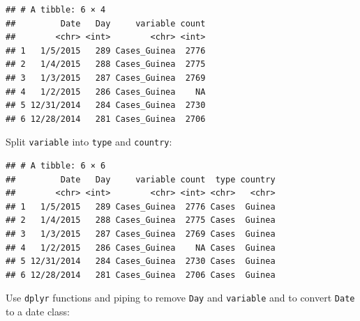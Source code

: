 \documentclass[]{book}
\makeatletter
\newenvironment{Shaded}{\begin{snugshade}}{\end{snugshade}}
\newcommand{\KeywordTok}[1]{\textcolor[rgb]{0.13,0.29,0.53}{\textbf{{#1}}}}
\newcommand{\DataTypeTok}[1]{\textcolor[rgb]{0.13,0.29,0.53}{{#1}}}
\newcommand{\DecValTok}[1]{\textcolor[rgb]{0.00,0.00,0.81}{{#1}}}
\newcommand{\StringTok}[1]{\textcolor[rgb]{0.31,0.60,0.02}{{#1}}}
\newcommand{\OtherTok}[1]{\textcolor[rgb]{0.56,0.35,0.01}{{#1}}}
\newcommand{\NormalTok}[1]{{#1}}
\newenvironment{kframe}{%
\medskip{}
\setlength{\fboxsep}{.8em}
 \def\at@end@of@kframe{}%
 \ifinner\ifhmode%
  \def\at@end@of@kframe{\end{minipage}}%
  \begin{minipage}{\columnwidth}%
 \fi\fi%
 \def\FrameCommand##1{\hskip\@totalleftmargin \hskip-\fboxsep
 \colorbox{shadecolor}{##1}\hskip-\fboxsep
     \hskip-\linewidth \hskip-\@totalleftmargin \hskip\columnwidth}%
 \MakeFramed {\advance\hsize-\width
   \@totalleftmargin\z@ \linewidth\hsize
   \@setminipage}}%
 {\par\unskip\endMakeFramed%
 \at@end@of@kframe}
\renewenvironment{Shaded}{\begin{kframe}}{\end{kframe}}
\makeatother
\begin{document}
\begin{verbatim}
## # A tibble: 6 × 4
##         Date   Day     variable count
##        <chr> <int>        <chr> <int>
## 1   1/5/2015   289 Cases_Guinea  2776
## 2   1/4/2015   288 Cases_Guinea  2775
## 3   1/3/2015   287 Cases_Guinea  2769
## 4   1/2/2015   286 Cases_Guinea    NA
## 5 12/31/2014   284 Cases_Guinea  2730
## 6 12/28/2014   281 Cases_Guinea  2706
\end{verbatim}

Split \texttt{variable} into \texttt{type} and \texttt{country}:

\begin{Shaded}
\end{Shaded}

\begin{verbatim}
## # A tibble: 6 × 6
##         Date   Day     variable count  type country
##        <chr> <int>        <chr> <int> <chr>   <chr>
## 1   1/5/2015   289 Cases_Guinea  2776 Cases  Guinea
## 2   1/4/2015   288 Cases_Guinea  2775 Cases  Guinea
## 3   1/3/2015   287 Cases_Guinea  2769 Cases  Guinea
## 4   1/2/2015   286 Cases_Guinea    NA Cases  Guinea
## 5 12/31/2014   284 Cases_Guinea  2730 Cases  Guinea
## 6 12/28/2014   281 Cases_Guinea  2706 Cases  Guinea
\end{verbatim}

Use \texttt{dplyr} functions and piping to remove \texttt{Day} and
\texttt{variable} and to convert \texttt{Date} to a date class:

\begin{Shaded}
\end{Shaded}
\end{document}
